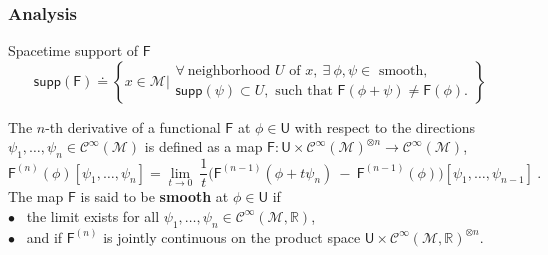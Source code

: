 \documentclass[9pt]{beamer}
\newcommand{\supp}{\mathsf{supp}}
\newcommand{\Ccal}{\mathcal{C}}
\newcommand{\Mcal}{\mathcal{M}}
\newcommand{\Rbb}{\mathbb{R}}
\newcommand{\Fsf}{\mathsf{F}}
\newcommand{\Usf}{\mathsf{U}}
\begin{document}
\begin{frame}[label=details_obs]

\frametitle{Analysis}

\vfill

\begin{block}{Spacetime support of $\Fsf$}
\vspace*{-15pt}
\begin{equation*}
\supp(\Fsf) \doteq \left\{ x \in \Mcal \bigg| 
\begin{array}{l} 
\forall \ \mbox{neighborhood } U \mbox{ of } x, \ \exists \ \phi, \psi \in \mbox{ smooth}, \\
\supp(\psi) \subset U, \mbox{ such that } \Fsf(\phi + \psi) \neq \Fsf(\phi).
\end{array}
\right\}
\end{equation*}
\end{block}

\vfill

\begin{definition}
\vspace*{-5pt}
The $n$-th derivative of a functional $\Fsf$ at $\phi \in \Usf$ with respect to the directions $\psi_1, \dots, \psi_n \in \Ccal^\infty(\Mcal)$ is defined as a map $\Fsf : \Usf \times \Ccal^\infty(\Mcal)^{\otimes n} \to \Ccal^\infty(\Mcal)$,
%
\begin{equation*}
\Fsf^{(n)}(\phi)[\psi_1,\dots ,\psi_n] =  \lim_{t \to 0} \ \frac{1}{t} \bigg( \Fsf^{(n-1)}(\phi + t \psi_n) \ - \ \Fsf^{(n-1)}(\phi) \bigg)[\psi_1,\dots ,\psi_{n-1}] \ .
\end{equation*}
%
The map $\Fsf$ is said to be \textbf{smooth} at $\phi \in \Usf$ if \hfill\hyperlink{joint_cont}{}\\
%
$\bullet$ \ the limit exists for all $\psi_1, \dots, \psi_n \in \Ccal^\infty(\Mcal,\Rbb)$,\\
$\bullet$ \ and if $\Fsf^{(n)}$ is jointly continuous on the product space $\Usf \times \Ccal^\infty(\Mcal,\Rbb)^{\otimes n}$.\\ 
%
\end{definition}

\vfill


\vfill

\hfill\hyperlink{obs}{}

\end{frame}

\end{document}
